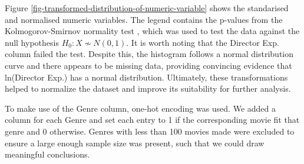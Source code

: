         Figure \ref*{fig-transformed-distribution-of-numeric-variable} shows the
        standarised and normalised numeric variables. The legend contains the p-values
        from the Kolmogorov-Smirnov normality test \cite*{KStest}, which was used to
        test the data against the null hypothesis $H_{0}: X \not\sim N(0,1)$. It is
        worth noting that the Director Exp. column failed the test. Despite this, the histogram follows a
        normal distribution curve and there appears to be missing data, providing convincing evidence that ln(Director Exp.)
        has a normal distribution. Ultimately, these transformations helped to normalize
        the dataset and improve its suitability for further analysis.

        To make use of the Genre column, one-hot encoding was used.
        We added a column for each Genre and set each entry to 1 if the corresponding
            movie fit that genre and 0 otherwise.
        Genres with less than 100 movies made were excluded to ensure a large enough
            sample size was present, such that we could draw meaningful conclusions.
